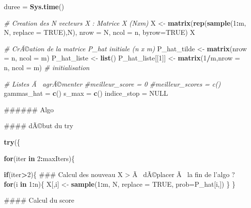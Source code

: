 \documentclass[]{article}
\newenvironment{Shaded}{\begin{snugshade}}{\end{snugshade}}
\newcommand{\CommentTok}[1]{\textcolor[rgb]{0.56,0.35,0.01}{\textit{#1}}}
\newcommand{\ControlFlowTok}[1]{\textcolor[rgb]{0.13,0.29,0.53}{\textbf{#1}}}
\newcommand{\DataTypeTok}[1]{\textcolor[rgb]{0.13,0.29,0.53}{#1}}
\newcommand{\DecValTok}[1]{\textcolor[rgb]{0.00,0.00,0.81}{#1}}
\newcommand{\KeywordTok}[1]{\textcolor[rgb]{0.13,0.29,0.53}{\textbf{#1}}}
\newcommand{\NormalTok}[1]{#1}
\newcommand{\OperatorTok}[1]{\textcolor[rgb]{0.81,0.36,0.00}{\textbf{#1}}}
\newcommand{\OtherTok}[1]{\textcolor[rgb]{0.56,0.35,0.01}{#1}}
\newcommand{\StringTok}[1]{\textcolor[rgb]{0.31,0.60,0.02}{#1}}
\begin{document}
\begin{Shaded}
\begin{Highlighting}[]
\NormalTok{  duree =}\StringTok{ }\KeywordTok{Sys.time}\NormalTok{()}
  
  \CommentTok{# Creation des N vecteurs X  : Matrice X (Nxm)}
\NormalTok{  X <-}\StringTok{ }\KeywordTok{matrix}\NormalTok{(}\KeywordTok{rep}\NormalTok{(}\KeywordTok{sample}\NormalTok{(}\DecValTok{1}\OperatorTok{:}\NormalTok{m, N, }\DataTypeTok{replace =} \OtherTok{TRUE}\NormalTok{),N),}
              \DataTypeTok{nrow =}\NormalTok{ N, }\DataTypeTok{ncol =}\NormalTok{ n, }\DataTypeTok{byrow=}\OtherTok{TRUE}\NormalTok{)}
\NormalTok{  X}
  
  \CommentTok{# CrÃ©ation de la matrice P_hat initiale (n x m) }
\NormalTok{  P_hat_tilde <-}\StringTok{ }\KeywordTok{matrix}\NormalTok{(}\DataTypeTok{nrow =}\NormalTok{ n, }\DataTypeTok{ncol =}\NormalTok{ m)}
\NormalTok{  P_hat_liste <-}\StringTok{ }\KeywordTok{list}\NormalTok{()}
\NormalTok{  P_hat_liste[[}\DecValTok{1}\NormalTok{]] <-}\StringTok{ }\KeywordTok{matrix}\NormalTok{(}\DecValTok{1}\OperatorTok{/}\NormalTok{m,}\DataTypeTok{nrow =}\NormalTok{ n, }\DataTypeTok{ncol =}\NormalTok{ m) }\CommentTok{# initialisation}
  
  \CommentTok{# Listes Ã  agrÃ©menter}
  \CommentTok{#meilleur_score = 0}
  \CommentTok{#meilleur_scores = c()}
\NormalTok{  gammas_hat =}\StringTok{ }\KeywordTok{c}\NormalTok{()}
\NormalTok{  s_max =}\StringTok{ }\KeywordTok{c}\NormalTok{()}
\NormalTok{  indice_stop =}\StringTok{ }\OtherTok{NULL}
  
\NormalTok{  ###### Algo}
  
  
  
\NormalTok{  #### dÃ©but du try}
  
  \KeywordTok{try}\NormalTok{(\{}
    
    \ControlFlowTok{for}\NormalTok{(iter }\ControlFlowTok{in} \DecValTok{2}\OperatorTok{:}\NormalTok{maxIters)\{}
      
      \ControlFlowTok{if}\NormalTok{(iter}\OperatorTok{>}\DecValTok{2}\NormalTok{)\{}
\NormalTok{        ### Calcul des nouveau X > Ã  dÃ©placer Ã  la fin de l'algo ?}
        \ControlFlowTok{for}\NormalTok{(i }\ControlFlowTok{in} \DecValTok{1}\OperatorTok{:}\NormalTok{n)\{}
\NormalTok{          X[,i] <-}\StringTok{ }\KeywordTok{sample}\NormalTok{(}\DecValTok{1}\OperatorTok{:}\NormalTok{m, N, }\DataTypeTok{replace =} \OtherTok{TRUE}\NormalTok{, }\DataTypeTok{prob=}\NormalTok{P_hat[i,])}
\NormalTok{        \}}
\NormalTok{      \}}
      
\NormalTok{      #### Calcul du score}
      

\end{Highlighting}
\end{Shaded}
\end{document}

